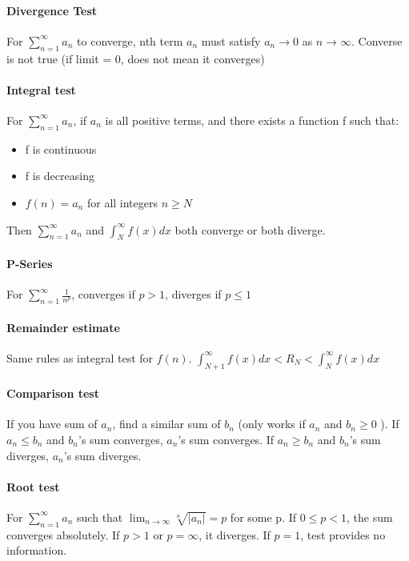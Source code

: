 \documentclass[10pt,landscape]{article}
\begin{document}
\begin{multicols}{4}
\paragraph{Divergence Test}
For $\sum_{n=1}^{\infty}a_n$ to converge, nth term $a_n$ must satisfy $a_n \rightarrow 0$ as $n \rightarrow \infty$. Converse is not true (if limit = 0, does not mean it converges)

\paragraph{Integral test}
For $\sum_{n=1}^{\infty}a_n$, if $a_n$ is all positive terms, and there exists a function f such that:

\begin{itemize}
	\item f is continuous
	\item f is decreasing
	\item $f(n) = a_n$ for all integers $n \geq N$
\end{itemize}

Then $\sum_{n=1}^{\infty}a_n$ and $\int_{N}^{\infty}f(x)dx$ both converge or both diverge.

\paragraph{P-Series}
For $\sum_{n=1}^{\infty} \frac{1}{n^p}$, converges if $p > 1$, diverges if $p \leq 1$

\paragraph{Remainder estimate}
Same rules as integral test for $f(n)$. 
$\int_{N+1}^{\infty} f(x)dx < R_N < \int_{N}^{\infty} f(x)dx$

\paragraph{Comparison test}
If you have sum of $a_n$, find a similar sum of $b_n$ (only works if $a_n$ and $b_n \geq 0$ ). If $a_n \leq b_n$ and $b_n$'s sum converges, $a_n$'s sum converges. If $a_n \geq b_n$ and $b_n$'s sum diverges, $a_n$'s sum diverges.

\paragraph{Root test}
For $\sum_{n=1}^{\infty}a_n$ such that $\lim_{n\rightarrow\infty}\sqrt[n]{|a_n|}=p$ for some p. If $0 \leq p < 1$, the sum converges absolutely. If $p > 1$ or $p = \infty$, it diverges. If $p = 1$, test provides no information.


\end{multicols}
\end{document}

